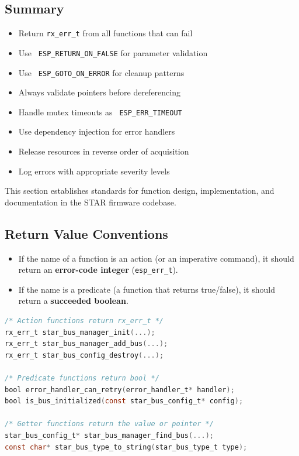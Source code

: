 \subsection{Summary}

\begin{itemize}
    \item Return \texttt{rx\_err\_t} from all functions that can fail
    \item Use \texttt{
      ESP\_RETURN\_ON\_FALSE} for parameter validation
    \item Use \texttt{
      ESP\_GOTO\_ON\_ERROR} for cleanup patterns
    \item Always validate pointers before dereferencing
    \item Handle mutex timeouts as \texttt{
      ESP\_ERR\_TIMEOUT}
    \item Use dependency injection for error handlers
    \item Release resources in reverse order of acquisition
    \item Log errors with appropriate severity levels
\end{itemize}



This section establishes standards for function design, implementation, and documentation in the STAR firmware codebase.

\subsection{Return Value Conventions}

\begin{itemize}
    \item If the name of a function is an action (or an imperative command), it should return an \textbf{error-code integer} (\texttt{esp\_err\_t}).
    \item If the name is a predicate (a function that returns true/false), it should return a \textbf{succeeded boolean}.
\end{itemize}

\begin{lstlisting}[language=C]
/* Action functions return rx_err_t */
rx_err_t star_bus_manager_init(...);
rx_err_t star_bus_manager_add_bus(...);
rx_err_t star_bus_config_destroy(...);

/* Predicate functions return bool */
bool error_handler_can_retry(error_handler_t* handler);
bool is_bus_initialized(const star_bus_config_t* config);

/* Getter functions return the value or pointer */
star_bus_config_t* star_bus_manager_find_bus(...);
const char* star_bus_type_to_string(star_bus_type_t type);
\end{lstlisting}

